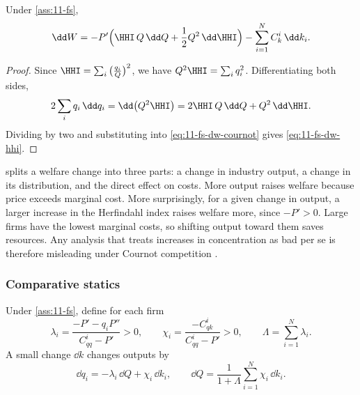 \begin{lemma}\label{lem:11-fs-hhi}
Under \cref{ass:11-fs},
\begin{equation}\label{eq:11-fs-dw-hhi}
\dd W = -P'\Big(\HHI\,Q\,\dd Q + \frac{1}{2}Q^2\,\dd\HHI\Big) - \sum_{i=1}^{N} C^i_k\,\dd k_i .
\end{equation}
\end{lemma}

\begin{proof}
Since $\HHI = \sum_i \big(\frac{q_i}{Q}\big)^2$, we have $Q^2\HHI = \sum_i q_i^2$. Differentiating both sides,
\begin{equation*}
2\sum_i q_i\,\dd q_i = \dd\big(Q^2\HHI\big) = 2\HHI\,Q\,\dd Q + Q^2\,\dd\HHI .
\end{equation*}
Dividing by two and substituting into \eqref{eq:11-fs-dw-cournot} gives \eqref{eq:11-fs-dw-hhi}.
\end{proof}

 splits a welfare change into three parts: a change in industry output, a change in its
distribution, and the direct effect on costs. More output raises welfare because price exceeds marginal cost.
More surprisingly, for a given change in output, a larger increase in the Herfindahl index raises welfare more,
since $-P' > 0$. Large firms have the lowest marginal costs, so shifting output toward them saves resources. Any
analysis that treats increases in concentration as bad per se is therefore misleading under Cournot competition
\citep[p.~8]{FarrellShapiro1988}.

\subsubsection{Comparative statics}

\begin{lemma}\label{lem:11-fs-statics}
Under \cref{ass:11-fs}, define for each firm
\begin{equation}\label{eq:11-fs-lambda}
\lambda_i = \frac{-P' - q_i P''}{C^i_{qq} - P'} > 0,
\qquad
\chi_i = \frac{-C^i_{qk}}{C^i_{qq} - P'} > 0,
\qquad
\Lambda = \sum_{i=1}^{N}\lambda_i .
\end{equation}
A small change $\dd k$ changes outputs by
\begin{equation}\label{eq:11-fs-dq}
\dd q_i = -\lambda_i\,\dd Q + \chi_i\,\dd k_i,
\qquad
\dd Q = \frac{1}{1 + \Lambda}\sum_{i=1}^{N}\chi_i\,\dd k_i .
\end{equation}
\end{lemma}

